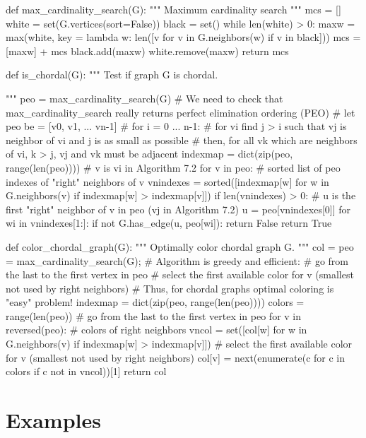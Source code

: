 \begin{sageCell}
def max_cardinality_search(G):
    """
    Maximum cardinality search
    """
    mcs = []
    white = set(G.vertices(sort=False))
    black = set()
    while len(white) > 0:
        maxw = max(white, key = lambda w: len([v for v in G.neighbors(w) if v in black]))
        mcs = [maxw] + mcs
        black.add(maxw)
        white.remove(maxw)
    return mcs

def is_chordal(G):
    """
    Test if graph G is chordal.

    """
    peo = max_cardinality_search(G)
    # We need to check that max_cardinality_search really returns perfect elimination ordering (PEO)
    # let peo be = [v0, v1, ... v{n-1}]
    # for i = 0 ... n-1:
    #    for vi find j > i such that vj is neighbor of vi and j is as small as possible
    #    then, for all vk which are neighbors of vi, k > j, vj and vk must be adjacent
    indexmap = dict(zip(peo, range(len(peo))))
    # v is vi in Algorithm 7.2
    for v in peo:
        # sorted list of peo indexes of "right" neighbors of v
        vnindexes = sorted([indexmap[w] for w in G.neighbors(v) if indexmap[w] > indexmap[v]])
        if len(vnindexes) > 0:
            # u is the first "right" neighbor of v in peo (vj in Algorithm 7.2)
            u = peo[vnindexes[0]]
            for wi in vnindexes[1:]:
                if not G.has_edge(u, peo[wi]):
                    return False
    return True

def color_chordal_graph(G):
    """
    Optimally color chordal graph G.
    """
    col = {}
    peo = max_cardinality_search(G);
    # Algorithm is greedy and efficient:
    #   go from the last to the first vertex in peo
    #   select the first available color for v (smallest not used by right neighbors)
    # Thus, for chordal graphs optimal coloring is "easy" problem!
    indexmap = dict(zip(peo, range(len(peo))))
    colors = range(len(peo))
    # go from the last to the first vertex in peo
    for v in reversed(peo):
        # colors of right neighbors
        vncol = set([col[w] for w in G.neighbors(v) if indexmap[w] > indexmap[v]])
        # select the first available color for v (smallest not used by right neighbors)
        col[v] = next(enumerate(c for c in colors if c not in vncol))[1]
    return col
\end{sageCell}

\section{Examples}

